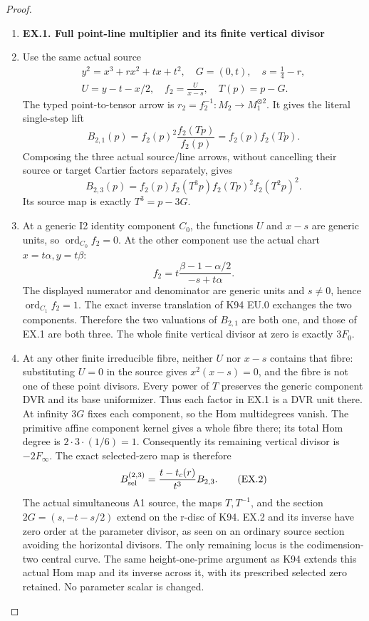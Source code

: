 \begin{proof}
\begin{enumerate}[label=\arabic*.]
\item \par

\medskip\noindent\textbf{EX.1. Full point-line multiplier and its finite vertical divisor}

\par\nobreak

\item Use the same actual source
\[
\begin{gathered}
 y^2=x^3+r x^2+t x+t^2,\quad G=(0,t),\quad s=\tfrac14-r,\\
 U=y-t-x/2,\quad f_2=\frac U{x-s},\quad T(p)=p-G.
\end{gathered}
\]
The typed point-to-tensor arrow is
\(r_2=f_2^{-1}:M_2\longrightarrow M_1^{\otimes2}\).
It gives the literal single-step lift
\[
 B_{2,1}(p)=f_2(p)^2\frac{f_2(Tp)}{f_2(p)}
          =f_2(p)f_2(Tp).
\]
Composing the three actual source/line arrows, without cancelling
their source or target Cartier factors separately, gives
\[
 B_{2,3}(p)=f_2(p)f_2(T^3p)f_2(Tp)^2f_2(T^2p)^2.
 \tag{EX.1}
\]
Its source map is exactly \(T^3=p-3G\).

\item At a generic I2 identity component \(C_0\), the functions \(U\)
and \(x-s\) are generic units, so \(\operatorname{ord}_{C_0}f_2=0\).
At the other component use the actual chart \(x=t\alpha,y=t\beta\):
\[
 f_2=t\frac{\beta-1-\alpha/2}{-s+t\alpha}.
\]
The displayed numerator and denominator are generic units and
\(s\ne0\), hence \(\operatorname{ord}_{C_1}f_2=1\).
The exact inverse translation of K94 EU.0 exchanges the two
components. Therefore the two valuations of \(B_{2,1}\) are
both one, and those of EX.1 are both three. The whole finite
vertical divisor at zero is exactly \(3F_0\).

\item At any other finite irreducible fibre, neither \(U\) nor \(x-s\)
contains that fibre: substituting \(U=0\) in the source gives
\(x^2(x-s)=0\), and the fibre is not one of these point divisors.
Every power of \(T\) preserves the generic component DVR and its
base uniformizer. Thus each factor in EX.1 is a DVR unit there.
At infinity \(3G\) fixes each component, so the Hom multidegrees
vanish. The primitive affine component kernel gives a whole fibre
there; its total Hom degree is \(2\cdot3\cdot(1/6)=1\).
Consequently its remaining vertical divisor is \(-2F_\infty\).
The exact selected-zero map is therefore
\[
 B^{(2,3)}_{\rm sel}=\frac{t-t_c(r)}{t^3}B_{2,3}.
 \tag{EX.2}
\]
The actual simultaneous A1 source, the maps \(T,T^{-1}\), and
the section \(2G=(s,-t-s/2)\) extend on the r-disc of K94.
EX.2 and its inverse have zero order at the parameter divisor,
as seen on an ordinary source section avoiding the horizontal
divisors. The only remaining locus is the codimension-two central
curve. The same height-one-prime argument as K94 extends this
actual Hom map and its inverse across it, with its prescribed
selected zero retained. No parameter scalar is changed.


\end{enumerate}
\end{proof}
